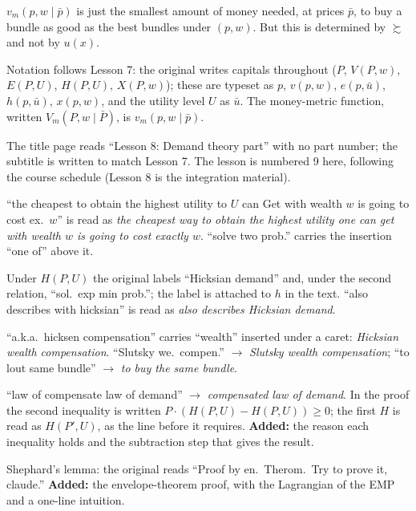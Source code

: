 \documentclass[11pt]{article}
\begin{document}
 $v_m(p,w\mid\bar p)$ is just the smallest amount of money needed, at
prices $\bar p$, to buy a bundle as good as the best bundles under $(p,w)$. But this
is determined by $\succsim$ and not by $u(x)$.


\begin{transcriptnotes}
  \item Notation follows Lesson 7: the original writes capitals throughout
        ($P$, $V(P,w)$, $E(P,U)$, $H(P,U)$, $X(P,w)$); these are typeset as
        $p$, $v(p,w)$, $e(p,\bar u)$, $h(p,\bar u)$, $x(p,w)$, and the utility
        level $U$ as $\bar u$. The money-metric function, written
        $V_m(P,w\mid\bar P)$, is $v_m(p,w\mid\bar p)$.
  \item The title page reads ``Lesson 8: Demand theory part'' with no part number;
        the subtitle is written to match Lesson 7. The lesson is numbered 9 here, following the course schedule (Lesson 8 is the integration material).
  \item ``the cheapest to obtain the highest utility to $U$ can Get with wealth $w$
        is going to cost ex.\ $w$'' is read as \emph{the cheapest way to obtain the
        highest utility one can get with wealth $w$ is going to cost exactly $w$}.
        ``solve two prob.'' carries the insertion ``one of'' above it.
  \item Under $H(P,U)$ the original labels ``Hicksian demand'' and, under the
        second relation, ``sol.\ exp min prob.''; the label is attached to $h$ in
        the text. ``also describes with hicksian'' is read as \emph{also describes
        Hicksian demand}.
  \item ``a.k.a.\ hicksen compensation'' carries ``wealth'' inserted under a
        caret: \emph{Hicksian wealth compensation}. ``Slutsky we.\ compen.''
        $\to$ \emph{Slutsky wealth compensation}; ``to lout same bundle'' $\to$
        \emph{to buy the same bundle}.
  \item ``law of compensate law of demand'' $\to$ \emph{compensated law of
        demand}. In the proof the second inequality is written
        $P\cdot(H(P,U)-H(P,U))\ge0$; the first $H$ is read as $H(P',U)$, as the
        line before it requires. \textbf{Added:} the reason each inequality holds
        and the subtraction step that gives the result.
  \item Shephard's lemma: the original reads ``Proof by en.\ Therom.\ Try to prove
        it, claude.'' \textbf{Added:} the envelope-theorem proof, with the
        Lagrangian of the EMP and a one-line intuition.

\end{transcriptnotes}
\end{document}
